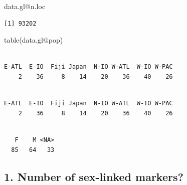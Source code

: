 \documentclass[
  letterpaper,
  DIV=11,
  numbers=noendperiod]{scrreprt}
\newenvironment{Shaded}{\begin{snugshade}}{\end{snugshade}}
\newcommand{\AttributeTok}[1]{\textcolor[rgb]{0.49,0.56,0.16}{#1}}
\newcommand{\FunctionTok}[1]{\textcolor[rgb]{0.02,0.16,0.49}{#1}}
\newcommand{\NormalTok}[1]{\textcolor[rgb]{0.00,0.44,0.13}{#1}}
\newcommand{\SpecialCharTok}[1]{\textcolor[rgb]{0.25,0.44,0.63}{#1}}
\newcommand{\StringTok}[1]{\textcolor[rgb]{0.25,0.44,0.63}{#1}}
\begin{document}
\begin{Shaded}
\begin{Highlighting}[]
\NormalTok{data.gl}\SpecialCharTok{@}\NormalTok{n.loc}
\end{Highlighting}
\end{Shaded}

\begin{verbatim}
[1] 93202
\end{verbatim}

\begin{Shaded}
\begin{Highlighting}[]
\FunctionTok{table}\NormalTok{(data.gl}\SpecialCharTok{@}\NormalTok{pop)}
\end{Highlighting}
\end{Shaded}

\begin{verbatim}

E-ATL  E-IO  Fiji Japan  N-IO W-ATL  W-IO W-PAC 
    2    36     8    14    20    36    40    26 
\end{verbatim}

\begin{Shaded}
\end{Shaded}

\begin{verbatim}

E-ATL  E-IO  Fiji Japan  N-IO W-ATL  W-IO W-PAC 
    2    36     8    14    20    36    40    26 
\end{verbatim}

\begin{Shaded}
\end{Shaded}

\begin{verbatim}

   F    M <NA> 
  85   64   33 
\end{verbatim}

\hypertarget{number-of-sex-linked-markers-2}{%
\subsection*{1. Number of sex-linked
markers?}\label{number-of-sex-linked-markers-2}}
\end{document}
